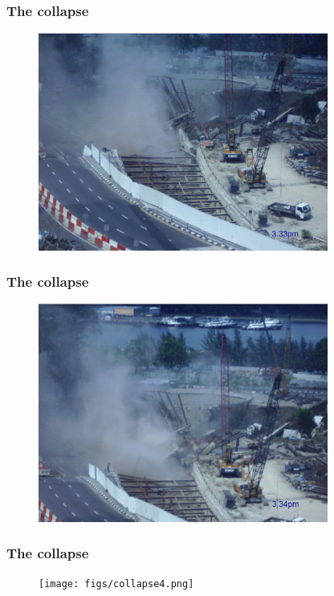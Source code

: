 \documentclass[notes]{beamer}
\begin{document}
\begin{frame}
\frametitle{The collapse}
\begin{figure}[ht]
	\centering
	\includegraphics[width=0.85\textwidth]{figs/collapse2.png}
\end{figure}
\end{frame}

\begin{frame}
\frametitle{The collapse}
\begin{figure}[ht]
	\centering
	\includegraphics[width=0.85\textwidth]{figs/collapse3.png}
\end{figure}
\end{frame}

\begin{frame}
\frametitle{The collapse}
\begin{figure}[ht]
	\centering
	\texttt{[image: figs/collapse4.png]}
\end{figure}
\end{frame}
\end{document}
